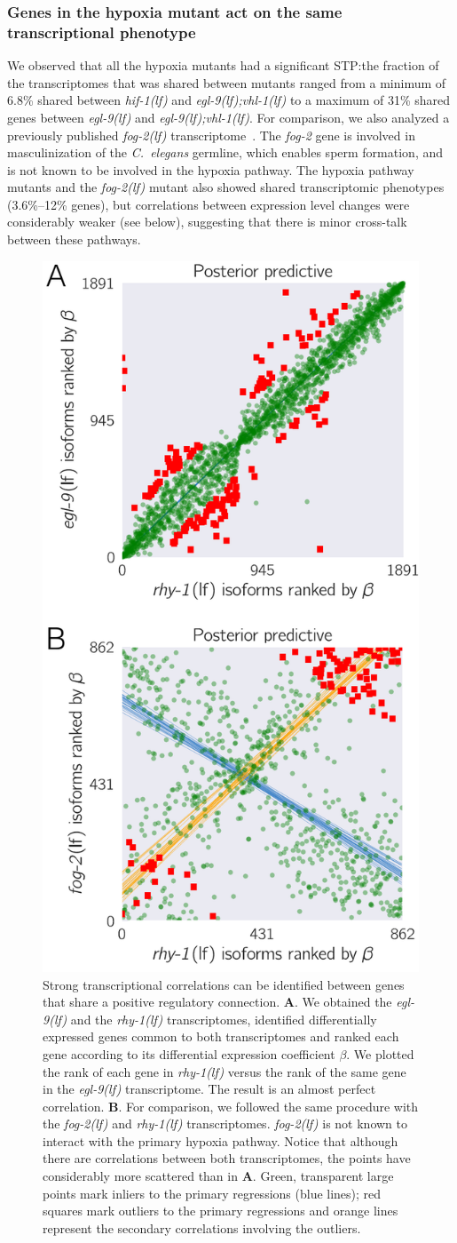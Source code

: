 \documentclass[10pt, onecolumn]{article}
\newcommand{\cel}{\emph{C.~elegans}}
\newcommand{\gene}[1]{\emph{#1}}
\newcommand{\fog}{\emph{\mbox{fog-2(lf)}}}
\newcommand{\egl}{\emph{\mbox{egl-9}(lf)}}
\newcommand{\rhy}{\emph{\mbox{rhy-1}(lf)}}
\newcommand{\eglvhl}{\emph{\mbox{egl-9(lf);vhl-1(lf)}}}
\newcommand{\hif}{\emph{\mbox{hif-1(lf)}}}
\begin{document}
\subsubsection*{Genes in the hypoxia mutant act on the same transcriptional phenotype}
\label{sec:phenotypes}
We observed that all the hypoxia mutants had a significant STP:\@ the fraction of
the transcriptomes that was shared between mutants
ranged from a minimum of 6.8\% shared between \hif{} and \eglvhl{} to a maximum
of 31\% shared genes between \egl{} and \eglvhl{}. For comparison, we also
analyzed a previously published \fog{} transcriptome~\cite{Angeles-Albores2016a}.
The \gene{fog-2} gene is involved in masculinization of the \cel{} germline,
which enables sperm formation, and is not known to be involved in the hypoxia
pathway. The hypoxia pathway mutants and the \fog{} mutant also showed shared
transcriptomic phenotypes (3.6\%--12\% genes), but correlations between
expression level changes were considerably weaker (see below), suggesting that
there is minor cross-talk between these pathways.

\begin{figure}[tbhp]
\centering
\includegraphics[width=.4\textwidth]{../figs/positive_and_control.pdf}
\caption{
Strong transcriptional correlations can be identified between genes
that share a positive regulatory connection.
\textbf{A}. We obtained the \egl{} and the \rhy{}
transcriptomes, identified differentially expressed genes common to both
transcriptomes and ranked each gene according to its differential expression
coefficient $\beta$. We plotted the rank of each gene in \rhy{} versus the
rank of the same gene in the \egl{} transcriptome. The result is an almost
perfect correlation.
\textbf{B}. For comparison, we followed the same procedure with the \fog{} and
\rhy{} transcriptomes. \fog{} is not known to interact with the primary hypoxia
pathway. Notice that although there are correlations between both transcriptomes,
the points have considerably more scattered than in \textbf{A}.
Green, transparent large points mark inliers to the primary regressions (blue
lines); red squares mark outliers to the primary regressions and orange lines
represent the secondary correlations involving the outliers.
}
\label{fig:genetic_interactions}
\end{figure}
\end{document}
